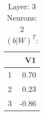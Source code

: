 \begin{table}[ht]
\centering
\begin{tabular}{rr}
  \hline
 & V1 \\ 
  \hline
1 & 0.70 \\ 
  2 & 0.23 \\ 
  3 & -0.86 \\ 
   \hline
\end{tabular}
\caption{Layer: 3 Neurons: 2  $(b|W)^T$: 
} 
\end{table}
